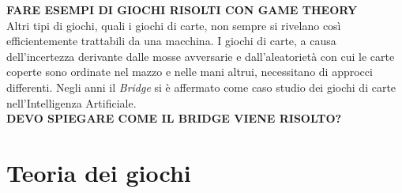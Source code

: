 \textbf{FARE ESEMPI DI GIOCHI RISOLTI CON GAME THEORY}\\



Altri tipi di giochi, quali i giochi di carte, non sempre si rivelano così efficientemente trattabili da una macchina.
I giochi di carte, a causa dell'incertezza derivante dalle mosse avversarie e dall'aleatorietà con cui le carte coperte sono ordinate nel mazzo e nelle mani altrui, necessitano di approcci differenti.
Negli anni il \emph{Bridge} si è affermato come caso studio dei giochi di carte nell'Intelligenza Artificiale.\\




\textbf{DEVO SPIEGARE COME IL BRIDGE VIENE RISOLTO?}\\







\section{Teoria dei giochi}




